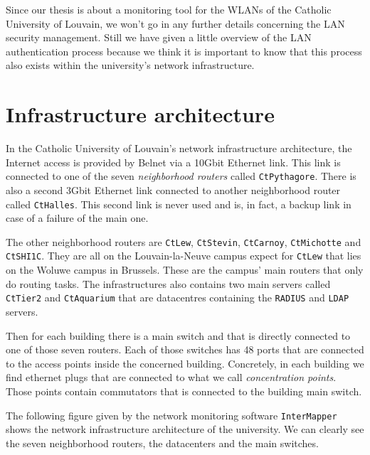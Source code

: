 Since our thesis is about a monitoring tool for the WLANs of the Catholic University of Louvain, we won't go in any further details concerning the LAN security management. 
Still we have given a little overview of the LAN authentication process because we think it is important to know that this process also exists within the university's network infrastructure.


\section{Infrastructure architecture}
In the Catholic University of Louvain's network infrastructure architecture, the Internet access is provided by Belnet via a 10Gbit Ethernet link. This link is connected to one of the seven \textit{neighborhood routers} called \texttt{CtPythagore}. There is also a second 3Gbit Ethernet link connected to another neighborhood router called \texttt{CtHalles}. This second link is never used and is, in fact, a backup link in case of a failure of the main one.

The other neighborhood routers are \texttt{CtLew}, \texttt{CtStevin}, \texttt{CtCarnoy}, \texttt{CtMichotte} and \texttt{CtSHI1C}. They are all on the Louvain-la-Neuve campus expect for \texttt{CtLew} that lies on the Woluwe campus in Brussels. These are the campus' main routers that only do routing tasks.
The infrastructures also contains two main servers called \texttt{CtTier2} and \texttt{CtAquarium} that are datacentres containing the \texttt{RADIUS} and \texttt{LDAP} servers.

Then for each building there is a main switch and that is directly connected to one of those seven routers. Each of those switches has 48 ports that are connected to the access points inside the concerned building.
Concretely, in each building we find ethernet plugs that are connected to what we call \textit{concentration points}. Those points contain commutators that is connected to the building main switch.

The following figure given by the network monitoring software \texttt{InterMapper}\cite{intermapper} shows the network infrastructure architecture of the university. We can clearly see the seven neighborhood routers, the datacenters and the main switches.

